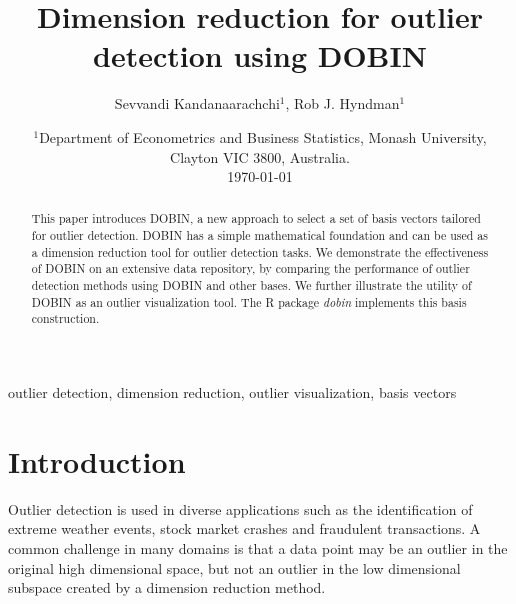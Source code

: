 \documentclass[letter,12pt]{article}
\begin{document}


\title{Dimension reduction for outlier detection using DOBIN}
\author{Sevvandi Kandanaarachchi$^1$, Rob J. Hyndman$^1$}
\date{%
   \scriptsize{ $^1$Department of Econometrics and Business Statistics, Monash University, Clayton VIC 3800, Australia.\\ [2ex]}%
    \today \\
}
\begin{titlingpage}
\maketitle

\begin{abstract}
	This paper introduces DOBIN, a new approach to select a set of basis vectors tailored for outlier detection. DOBIN has a {\color{blue} simple} mathematical foundation and can be used as a dimension reduction tool for outlier detection tasks. We demonstrate the effectiveness of DOBIN on an extensive data repository, by comparing the performance of outlier detection methods using DOBIN and other bases. We further illustrate the utility of DOBIN as an outlier visualization tool. The R package \textit{dobin} implements this basis construction.
\end{abstract}

\begin{keywords}outlier detection, dimension reduction, outlier visualization, basis vectors
\end{keywords}

\end{titlingpage}

\section{Introduction}

Outlier detection is used in diverse applications such as the identification of extreme weather events, stock market crashes and fraudulent transactions. A common challenge in many domains is that a data point may be an outlier in the original high dimensional space, but not an outlier in the low dimensional subspace created by a dimension reduction method.
\end{document}
